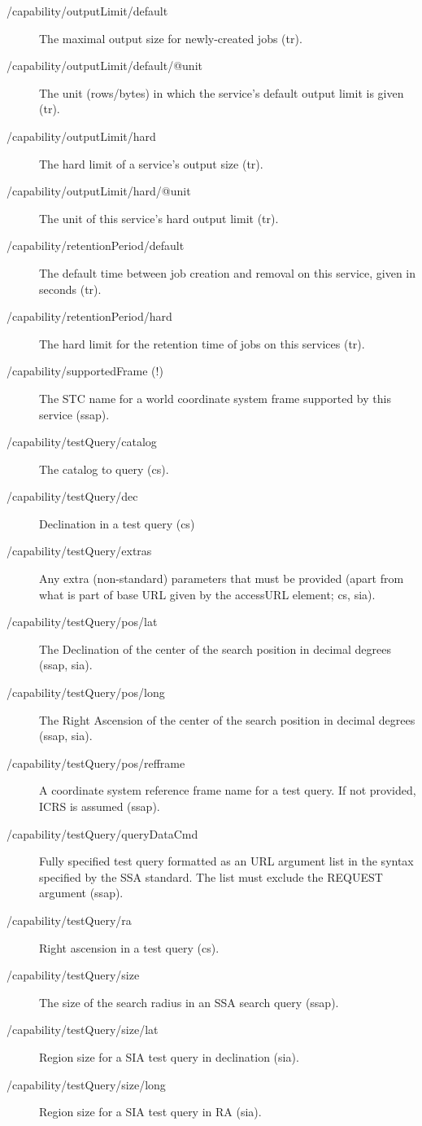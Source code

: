 \documentclass[11pt,a4paper]{ivoa}
\begin{document}
\begin{description}
\item[/capability/outputLimit/default]The maximal output size for newly-created jobs (tr).
\item[/capability/outputLimit/default/@unit]The unit (rows/bytes) in which the service's default output limit is given (tr).
\item[/capability/outputLimit/hard]The hard limit of a service's output size (tr).
\item[/capability/outputLimit/hard/@unit]The unit of this service's hard output limit (tr).
\item[/capability/retentionPeriod/default]The default time between job creation and removal on this service, given in seconds (tr).
\item[/capability/retentionPeriod/hard]The hard limit for the retention time of jobs on this services (tr).
\item[/capability/supportedFrame (!)]The STC name for a world coordinate system frame supported by this service (ssap).
\item[/capability/testQuery/catalog]The catalog to query (cs).
\item[/capability/testQuery/dec]Declination in a test query (cs)
\item[/capability/testQuery/extras]Any extra (non-standard) parameters that must be provided (apart from what is part of base URL given by the accessURL element; cs, sia).
\item[/capability/testQuery/pos/lat]The Declination of the center of the search position in decimal degrees (ssap, sia).
\item[/capability/testQuery/pos/long]The Right Ascension of the center of the search position in decimal degrees (ssap, sia).
\item[/capability/testQuery/pos/refframe]A coordinate system reference frame name for a test query. If not provided, ICRS is assumed (ssap).
\item[/capability/testQuery/queryDataCmd]Fully specified test query formatted as an URL argument list in the syntax specified by the SSA standard. The list must exclude the REQUEST argument (ssap).
\item[/capability/testQuery/ra]Right ascension in a test query (cs).
\item[/capability/testQuery/size]The size of the search radius in an SSA search query (ssap).
\item[/capability/testQuery/size/lat]Region size for a SIA test query in declination (sia).
\item[/capability/testQuery/size/long]Region size for a SIA test query in RA (sia).

\end{description}
\end{document}
